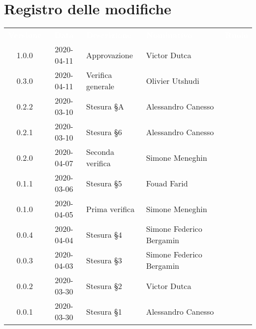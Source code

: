 \section*{Registro delle modifiche}
{
	\centering
	\begin{longtable}{ c c  C{4cm}  C{4cm}  C{3cm} }
		\textcolor{white}{\textbf{Versione}} & \textcolor{white}{\textbf{Data}} & \textcolor{white}{\textbf{Descrizione}} & \textcolor{white}{\textbf{Nominativo}} & \textcolor{white}{\textbf{Ruolo}}\\		
		1.0.0 & 2020-04-11   & Approvazione & Victor Dutca &\RdP{} \\
		0.3.0 & 2020-04-11   & Verifica generale & Olivier Utshudi &\ver{} \\
		0.2.2 & 2020-03-10 & Stesura \S A & Alessandro Canesso &\adm{} \\
		0.2.1 & 2020-03-10 & Stesura \S 6 & Alessandro Canesso &\adm{} \\
		0.2.0 & 2020-04-07   & Seconda verifica & Simone Meneghin &\ver{} \\
		0.1.1 & 2020-03-06 & Stesura \S 5  & Fouad Farid &\adm{} \\
		0.1.0 & 2020-04-05   & Prima verifica & Simone Meneghin &\ver{} \\
		0.0.4 & 2020-04-04 & Stesura \S 4  & Simone Federico Bergamin &\adm{}\\	
		0.0.3 & 2020-04-03 & Stesura \S 3  & Simone Federico Bergamin &\adm{}\\	
		0.0.2 & 2020-03-30 & Stesura \S 2  & Victor Dutca &\RdP{}\\	
		0.0.1 & 2020-03-30 & Stesura \S 1  & Alessandro Canesso &\adm{}\\		
	\end{longtable}
} 
